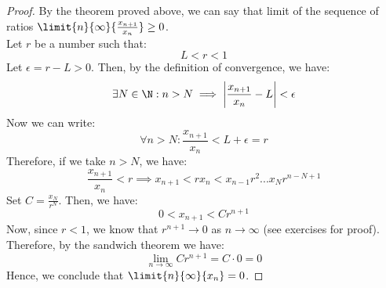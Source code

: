 \documentclass[openany]{book}
\begin{document}
\begin{proof}
    By the theorem proved above, we can say that limit of the sequence of ratios $\limit{n}{\infty}{\frac{x_{n+1}}{x_n}} \geq 0$. \\
    Let $r$ be a number such that: $$L < r < 1$$
    Let $\epsilon = r-L > 0$. Then, by the definition of convergence, we have:
    $$\exists N \in \N: n > N \implies \left|\frac{x_{n+1}}{x_n} - L\right| < \epsilon$$
    Now we can write:
    $$\forall n > N: \frac{x_{n+1}}{x_n} < L + \epsilon = r$$
    Therefore, if we take $n > N$, we have:
    $$\frac{x_{n+1}}{x_n} < r \implies x_{n+1} < r x_n < x_{n-1}r^2 ... x_N r^{n - N +1}$$
    Set $C = \frac{x_N}{r^N}$. Then, we have:
    $$0< x_{n+1} < C r^{n+1}$$
    Now, since $r < 1$, we know that $r^{n+1} \rightarrow 0$ as $n \rightarrow \infty$ (see exercises for proof). Therefore, by the sandwich theorem we have:
    $$\lim_{n \to \infty} C r^{n+1} = C \cdot 0 = 0$$
    Hence, we conclude that $\limit{n}{\infty}{x_n} = 0$. 
\end{proof}
\end{document}
